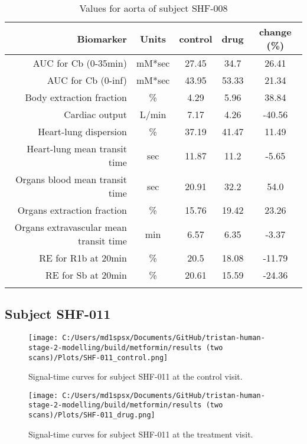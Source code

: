 \documentclass{epflreport}%
\begin{document}
\begin{longtable}{rcccc}%
\hline%
Biomarker&Units&control&drug&change (\%)\\%
\hline%
AUC for Cb (0{-}35min)&mM*sec&27.45&34.7&26.41\\%
AUC for Cb (0{-}inf)&mM*sec&43.95&53.33&21.34\\%
Body extraction fraction&\%&4.29&5.96&38.84\\%
Cardiac output&L/min&7.17&4.26&{-}40.56\\%
Heart{-}lung dispersion&\%&37.19&41.47&11.49\\%
Heart{-}lung mean transit time&sec&11.87&11.2&{-}5.65\\%
Organs blood mean transit time&sec&20.91&32.2&54.0\\%
Organs extraction fraction&\%&15.76&19.42&23.26\\%
Organs extravascular mean transit time&min&6.57&6.35&{-}3.37\\%
RE for R1b at 20min&\%&20.5&18.08&{-}11.79\\%
RE for Sb at 20min&\%&20.61&15.59&{-}24.36\\%
\hline%
\caption{Values for aorta of subject SHF-008} \\%
\end{longtable}%
\clearpage%
\subsection{Subject SHF{-}011}%
\label{subsec:SubjectSHF{-}011}%

%


\begin{figure}[h!]%
\centering%
\texttt{[image: C:/Users/md1spsx/Documents/GitHub/tristan-human-stage-2-modelling/build/metformin/results (two scans)/Plots/SHF-011\_control.png]}%
\caption{Signal{-}time curves for subject SHF{-}011 at the control visit.}%
\end{figure}

%


\begin{figure}[h!]%
\centering%
\texttt{[image: C:/Users/md1spsx/Documents/GitHub/tristan-human-stage-2-modelling/build/metformin/results (two scans)/Plots/SHF-011\_drug.png]}%
\caption{Signal{-}time curves for subject SHF{-}011 at the treatment visit.}%
\end{figure}
\end{document}
